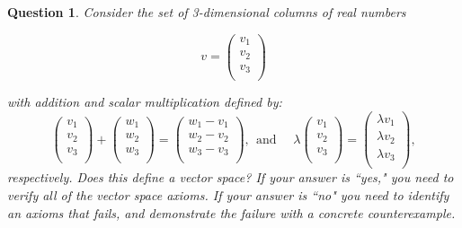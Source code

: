 \documentclass[12pt]{article}
\newtheorem{question}[thm]{Question}
\begin{document}
\vspace{0.4cm}

\begin{question}
\normalfont
Consider the set of 3-dimensional columns of real numbers

$$ v =  \left( \begin{array}{c}
v_1 \\
v_2 \\
v_3 \\

 \end{array} \right)$$

 with addition and scalar multiplication defined by:
\[
 \left( \begin{array}{c}
v_1 \\
v_2 \\
v_3 \\

 \end{array} \right)  +  \left( \begin{array}{c}
w_1 \\
w_2 \\
w_3 \\

 \end{array}  \right)= \left( \begin{array}{c}
w_1 - v_1 \\
w_2 - v_2\\
w_3 - v_3\\

\end{array} \right), \ \ \mathrm{and}  \ \ \ \ \ \ \lambda \left( \begin{array}{c}
v_1 \\
v_2 \\
v_3 \\ 

 \end{array} \right) = \left( \begin{array}{c}
\lambda v_1 \\
\lambda v_2 \\
\lambda v_3 \\

 \end{array} \right),
\]
respectively. Does this define a vector space? If your answer is ``yes," you need to verify all of the vector space axioms. If your answer is ``no" you need to identify an axioms that fails, and demonstrate the failure with a concrete counterexample. 	


\end{question}
\end{document}
